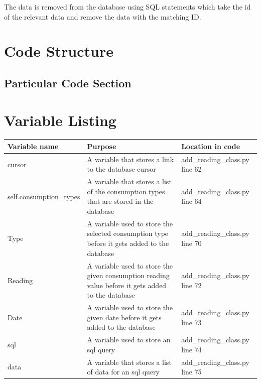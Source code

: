 The data is removed from the database using SQL statements which take the id of the relevant data and remove the data with the matching ID.

\section{Code Structure}

\subsection{Particular Code Section}

\section{Variable Listing}
\begin{center}
	\begin{tabular}{|p{4cm}|p{4cm}|p{4cm}|}
	\hline
	\textbf{Variable name} & \textbf{Purpose} & \textbf{Location in code} \\ \hline
	cursor & A variable that stores a link to the database cursor & add\_reading\_class.py line 62 \\ \hline
	self.consumption\_types & A variable that stores a list of the consumption types that are stored in the database & add\_reading\_class.py line 64 \\ \hline
	Type & A variable used to store the selected consumption type before it gets added to the database & add\_reading\_class.py line 70 \\ \hline
	Reading & A variable used to store the given consumption reading value before it gets added to the database & add\_reading\_class.py line 72 \\ \hline
	Date & A variable used to store the given date before it gets added to the database & add\_reading\_class.py line 73 \\ \hline
	sql & A variable used to store an sql query & add\_reading\_class.py line 74 \\ \hline
	data & A variable that stores a list of data for an sql query & add\_reading\_class.py line 75 \\ \hline
	\end{tabular}
\end{center}
